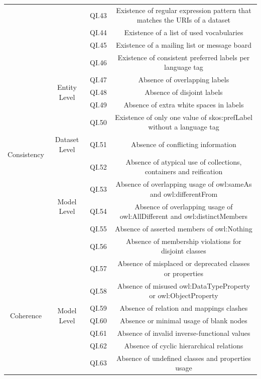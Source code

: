 \documentclass[onecolumn, crcready]{iosart2c}
\begin{document}
\begin{landscape}
\begin{center}
{\begin{longtable}[h]{|c|c|c|c|}
\cline{3-4} 
 &  & QI.43 & Existence of regular expression pattern that matches the URIs of a dataset \cite{Framework2012}\tabularnewline
\cline{3-4} 
 &  & QI.44 & Existence of a list of used vocabularies \tabularnewline
\cline{3-4} 
 &  & QI.45 & Existence of a mailing list or message board \cite{flemming2010}\tabularnewline
\hline 
\multirow{11}{*}{Consistency} & \multirow{5}{*}{Entity Level} & QI.46 & Existence of consistent preferred labels per language tag \cite{skosprimer}\cite{Mader2012}\tabularnewline
\cline{3-4} 
 &  & QI.47 & Absence of overlapping labels\tabularnewline
\cline{3-4} 
 &  & QI.48 & Absence of disjoint labels \cite{Mader2012}\tabularnewline
\cline{3-4} 
 &  & QI.49 & Absence of extra white spaces in labels \cite{Suominen:2012:IQS:2413941.2413985}\tabularnewline
\cline{3-4} 
 &  & QI.50 & Existence of only one value of skos:prefLabel without a language tag  \cite{Mader2012}\cite{Suominen:2012:IQS:2413941.2413985}\tabularnewline
\cline{2-4} 
 & \multirow{1}{*}{Dataset Level} & QI.51 & Absence of conflicting information \cite{Mendes2012}\tabularnewline
\cline{2-4} 
 & \multirow{5}{*}{Model Level} & QI.52 & Absence of atypical use of collections, containers and reification \cite{Hogan2010}\tabularnewline
\cline{3-4} 
 &  & QI.53 & Absence of overlapping usage of owl:sameAs and owl:differentFrom  \cite{Hogan2010}\tabularnewline
\cline{3-4} 
 &  & QI.54 & Absence of overlapping usage of owl:AllDifferent and owl:distinctMembers  \cite{Hogan2010}\tabularnewline
\cline{3-4} 
 &  & QI.55 & Absence of asserted members of owl:Nothing  \cite{Hogan2010}\tabularnewline
\cline{3-4} 
 &  & QI.56 & Absence of membership violations for disjoint classes  \cite{Hogan2010}\tabularnewline
\hline 
\hline 
\multirow{10}{*}{Coherence} & \multirow{10}{*}{Model Level} & QI.57 & Absence of misplaced or deprecated classes or properties  \cite{Hogan2010}\tabularnewline
\cline{3-4} 
 &  & QI.58 & Absence of misused owl:DataTypeProperty or owl:ObjectProperty  \cite{Hogan2010}\tabularnewline
\cline{3-4} 
 &  & QI.59 & Absence of relation and mappings clashes  \cite{Suominen:2012:IQS:2413941.2413985}\tabularnewline
\cline{3-4}
 &  & QI.60 & Absence or minimal usage of blank nodes \cite{Hogan:2012:ESL:2263498.2264570}\tabularnewline
\cline{3-4} 
 &  & QI.61 & Absence of invalid inverse-functional values \cite{Hogan2010}\tabularnewline
\cline{3-4} 
 &  & QI.62 & Absence of cyclic hierarchical relations \cite{conf/jcdl/Soergel05}\cite{Suominen:2012:IQS:2413941.2413985}\cite{Mader2012}\tabularnewline
\cline{3-4} 
 &  & QI.63 & Absence of undefined classes and properties usage \cite{Hogan2010}\tabularnewline

\end{longtable}}
\end{center}
\end{landscape}
\end{document}

